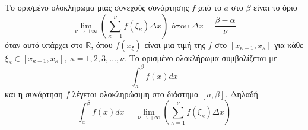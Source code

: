 Το ορισμένο ολοκλήρωμα μιας συνεχούς συνάρτησης $ f $݂ από το $ a $ στο $ \beta $ είναι το όριο
\[ \lim _{\nu \rightarrow+\infty}\left(\sum_{\kappa=1}^{\nu} f\left(\xi_{\kappa}\right) \Delta x\right) \text { όπου } \Delta x=\frac{\beta-\alpha}{\nu} \]
όταν αυτό υπάρχει στο $ \mathbb{R} $, όπου $ f(x_\xi) $ είναι μια τιμή της $ f $ στο $ [x_{\kappa-1},x_{\kappa}] $ για κάθε $ \xi_{\kappa}\in[x_{\kappa-1},x_{\kappa}],\ \kappa=1,2,3,\ldots,\nu $. Το ορισμένο ολοκλήρωμα συμβολίζεται με 
\[ \int_{a}^{\beta}f(x)dx \]
και η συνάρτηση $ f $ λέγεται ολοκληρώσιμη στο διάστημα $ [a,\beta] $. Δηλαδή 
\[ \int_{a}^{\beta}f(x)dx=\lim _{\nu \rightarrow+\infty}\left(\sum_{\kappa=1}^{\nu} f\left(\xi_{\kappa}\right) \Delta x\right) \]
